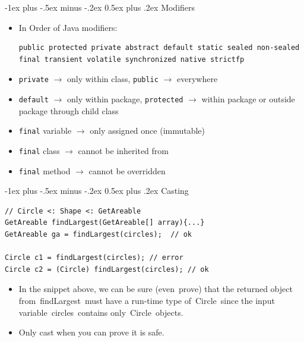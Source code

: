\documentclass[12pt, landscape]{article}
\makeatletter
\newcommand{\code}[1]{\colorbox{gray!25!}{\lstinline|#1|}}
\renewcommand{\section}{\@startsection{section}{1}{0mm}%
                                {-1ex plus -.5ex minus -.2ex}%
                                {0.5ex plus .2ex}%
                                {\normalfont\large\bfseries}}
\makeatother
\begin{document}
\begin{multicols*}{3}
\section{Modifiers}
\begin{itemize}
	\item In Order of Java modifiers:
\begin{lstlisting}
public protected private abstract default static sealed non-sealed final transient volatile synchronized native strictfp
\end{lstlisting}
	\item \code{private} $\rightarrow$ only within class, \code{public} $\rightarrow$ everywhere
	\item \code{default} $\rightarrow$ only within package, \code{protected} $\rightarrow$ within package or outside package through child class ~\\

	\item \code{final} variable $\rightarrow$ only assigned once (immutable)
	\item \code{final} class $\rightarrow$ cannot be inherited from
	\item \code{final} method $\rightarrow$ cannot be overridden

\end{itemize}

\section{Casting}
\begin{lstlisting}
// Circle <: Shape <: GetAreable
GetAreable findLargest(GetAreable[] array){...}
GetAreable ga = findLargest(circles);  // ok

Circle c1 = findLargest(circles); // error
Circle c2 = (Circle) findLargest(circles); // ok
\end{lstlisting}
\begin{itemize}
	\item In the snippet above, we can be sure (even prove) that the returned object from findLargest must have a run-time type of Circle since the input variable circles contains only Circle objects.
	\item Only cast when you can prove it is safe.
\end{itemize}


\end{multicols*}
\end{document}
